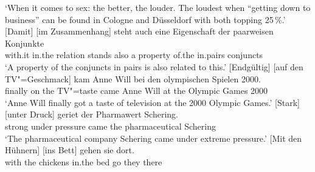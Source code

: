 \glt `When it comes to sex: the better, the louder. The loudest when ``getting down to business'' can be found in Cologne and Düsseldorf with both topping 25\,\%.'
\ex 
\gll {}[Damit] [im Zusammenhang] steht auch eine Eigenschaft der paarweisen Konjunkte\footnotemark\\
	 \spacebr{}with.it \spacebr{}in.the relation stands also a property of.the in.pairs conjuncts\\
\glt `A property of the conjuncts in pairs is also related to this.'
\ex 
\gll {}[Endgültig] [auf den TV"=Geschmack] kam Anne Will bei den olympischen Spielen 2000.\footnotemark\\
	 \spacebr{}finally \spacebr{}on the TV"=taste came Anne Will at the Olympic Games 2000\\
\glt `Anne Will finally got a taste of television at the 2000 Olympic Games.'
%
\ex 
\gll {}[Stark] [unter Druck] geriet der Pharmawert Schering.\footnotemark\\
	 \spacebr{}strong \spacebr{}under pressure came the pharmaceutical Schering\\
\glt `The pharmaceutical company Schering came under extreme pressure.'
\zl
\eal
\ex\label{mit-den-huehnern-ins-bett}
\gll {}[Mit den Hühnern] [ins Bett] gehen sie dort.\footnotemark\\
     \spacebr{}with the chickens \spacebr{}in.the bed go they there\\
